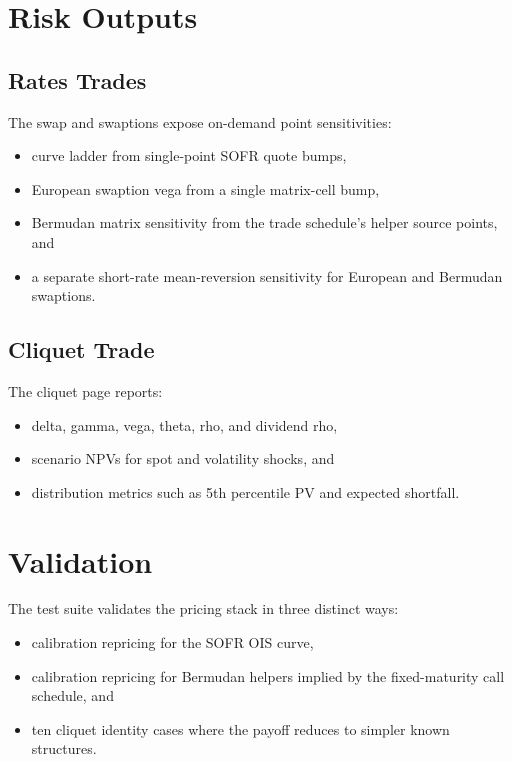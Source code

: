 \documentclass[11pt]{article}
\begin{document}
\section{Risk Outputs}
\subsection{Rates Trades}
The swap and swaptions expose on-demand point sensitivities:
\begin{itemize}[leftmargin=1.5em]
    \item curve ladder from single-point SOFR quote bumps,
    \item European swaption vega from a single matrix-cell bump,
    \item Bermudan matrix sensitivity from the trade schedule's helper source points, and
    \item a separate short-rate mean-reversion sensitivity for European and Bermudan swaptions.
\end{itemize}

\subsection{Cliquet Trade}
The cliquet page reports:
\begin{itemize}[leftmargin=1.5em]
    \item delta, gamma, vega, theta, rho, and dividend rho,
    \item scenario NPVs for spot and volatility shocks, and
    \item distribution metrics such as 5th percentile PV and expected shortfall.
\end{itemize}

\section{Validation}
The test suite validates the pricing stack in three distinct ways:
\begin{itemize}[leftmargin=1.5em]
    \item calibration repricing for the SOFR OIS curve,
    \item calibration repricing for Bermudan helpers implied by the fixed-maturity call schedule, and
    \item ten cliquet identity cases where the payoff reduces to simpler known structures.
\end{itemize}
\end{document}
